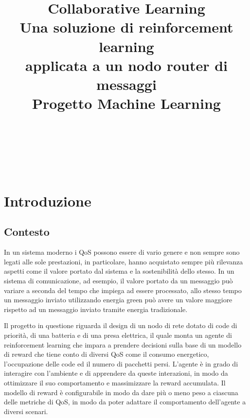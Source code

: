 \documentclass[conference]{IEEEtran}
\begin{document}
\let\subsectionautorefname\sectionautorefname
\let\subsubsectionautorefname\sectionautorefname
\title{Collaborative Learning\\ \large Una soluzione di reinforcement learning\\ applicata a un nodo router di messaggi\\
{\footnotesize Progetto Machine Learning}
}
\author{
 \\
\and
{}
 \\
\and
{}
 \\
}

\maketitle
\thispagestyle{plain}
\pagestyle{plain}

\begin{abstract}
\end{abstract}

\section{Introduzione}

\subsection{Contesto}
In un sistema moderno i QoS possono essere di vario genere e non sempre sono legati alle sole prestazioni, in particolare, hanno acquistato sempre più rilevanza aspetti come il valore portato dal sistema e la sostenibilità dello stesso. In un sistema di comunicazione, ad esempio, il valore portato da un messaggio può variare a seconda del tempo che impiega ad essere processato, allo stesso tempo un messaggio inviato utilizzando energia green può avere un valore maggiore rispetto ad un messaggio inviato tramite energia tradizionale.

Il progetto in questione riguarda il design di un nodo di rete dotato di code di priorità, di una batteria e di una presa elettrica, il quale monta un agente di reinforcement learning che impara a prendere decisioni sulla base di un modello di reward che tiene conto di diversi QoS come il consumo energetico, l'occupazione delle code ed il numero di pacchetti persi. L'agente è in grado di interagire con l'ambiente e di apprendere da queste interazioni, in modo da ottimizzare il suo comportamento e massimizzare la reward accumulata. Il modello di reward è configurabile in modo da dare più o meno peso a ciascuna delle metriche di QoS, in modo da poter adattare il comportamento dell'agente a diversi scenari.
\end{document}
